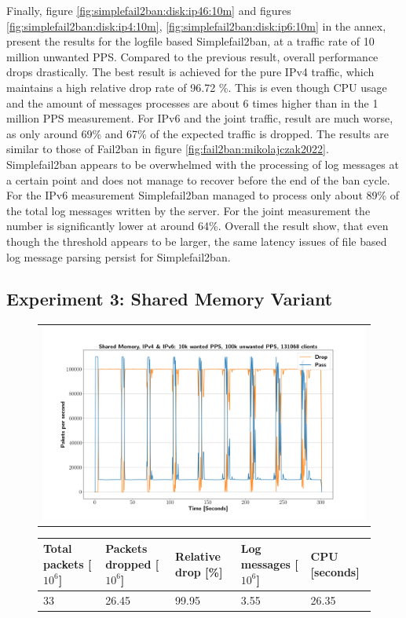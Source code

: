 Finally, figure \ref{fig:simplefail2ban:disk:ip46:10m} and figures \ref{fig:simplefail2ban:disk:ip4:10m}, \ref{fig:simplefail2ban:disk:ip6:10m} in the annex, present the results
for the logfile based Simplefail2ban, at a traffic rate of 10 million unwanted \ac{PPS}. Compared to the previous result, overall performance drops drastically. The best result is achieved for the pure
\ac{IPv4} traffic, which maintains a high relative drop rate of 96.72 \%. This is even though CPU usage and the amount of messages processes are about 6 times 
higher than in the 1 million \ac{PPS} measurement. For \ac{IPv6} and the joint traffic, result are much worse, as only around 69\% and 67\% of the expected traffic is dropped.
The results are similar to those of Fail2ban in figure \ref{fig:fail2ban:mikolajczak2022}. Simplefail2ban appears to be overwhelmed with the processing of log messages at a certain point and
does not manage to recover before the end of the ban cycle. For the \ac{IPv6} measurement Simplefail2ban managed to process only about 89\% of the total log messages written by the server. For the joint measurement
the number is significantly lower at around 64\%. Overall the result show, that even though the threshold appears to be larger, the same latency issues of file based log message parsing persist for Simplefail2ban.

\pagebreak

\subsection{Experiment 3: Shared Memory Variant}


\begin{figure}[!h]
	\centering
	\scriptsize
	\begin{tabular}{c}
    	\centerline{\includegraphics[width=1.2\textwidth]{images/simplefail2ban_shm_ipv46_v10k_iv100k_c131068.png}}
	\end{tabular}
	\begin{tabular}{lllll}
		\toprule
		\textbf{Total packets [$10^6$]} & \textbf{Packets dropped [$10^6$]} & \textbf{Relative drop [\%]} & \textbf{Log messages [$10^6$]} & \textbf{CPU [seconds]} \\ \midrule 
		33 & 26.45 & 99.95 & 3.55 & 26.35 \\
		\bottomrule
	\end{tabular}
	\caption[Simplefail2ban, Shared Memory, IPv4 \& IPv6, 100k \ac{PPS}]{}
	\label{fig:simplefail2ban:shm:ip46:100k}
\end{figure}


